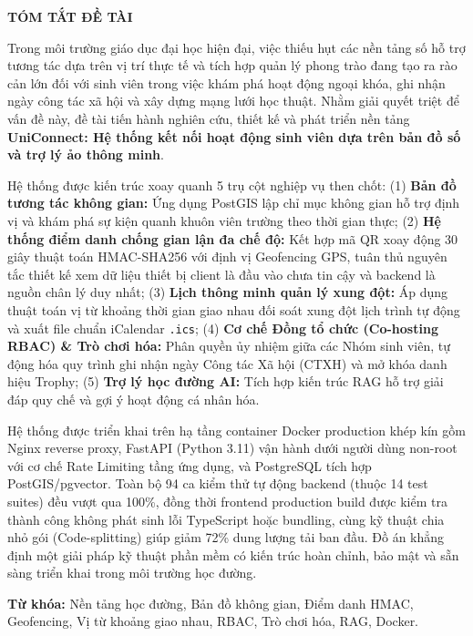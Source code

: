 \begin{center}
    \Large{\textbf{TÓM TẮT ĐỀ TÀI}}
\end{center}

Trong môi trường giáo dục đại học hiện đại, việc thiếu hụt các nền tảng số hỗ trợ tương tác dựa trên vị trí thực tế và tích hợp quản lý phong trào đang tạo ra rào cản lớn đối với sinh viên trong việc khám phá hoạt động ngoại khóa, ghi nhận ngày công tác xã hội và xây dựng mạng lưới học thuật. Nhằm giải quyết triệt để vấn đề này, đề tài tiến hành nghiên cứu, thiết kế và phát triển nền tảng \textbf{UniConnect: Hệ thống kết nối hoạt động sinh viên dựa trên bản đồ số và trợ lý ảo thông minh}.

Hệ thống được kiến trúc xoay quanh 5 trụ cột nghiệp vụ then chốt: (1) \textbf{Bản đồ tương tác không gian:} Ứng dụng PostGIS lập chỉ mục không gian hỗ trợ định vị và khám phá sự kiện quanh khuôn viên trường theo thời gian thực; (2) \textbf{Hệ thống điểm danh chống gian lận đa chế độ:} Kết hợp mã QR xoay động 30 giây thuật toán HMAC-SHA256 với định vị Geofencing GPS, tuân thủ nguyên tắc thiết kế xem dữ liệu thiết bị client là đầu vào chưa tin cậy và backend là nguồn chân lý duy nhất; (3) \textbf{Lịch thông minh quản lý xung đột:} Áp dụng thuật toán vị từ khoảng thời gian giao nhau đối soát xung đột lịch trình tự động và xuất file chuẩn iCalendar \texttt{.ics}; (4) \textbf{Cơ chế Đồng tổ chức (Co-hosting RBAC) \& Trò chơi hóa:} Phân quyền ủy nhiệm giữa các Nhóm sinh viên, tự động hóa quy trình ghi nhận ngày Công tác Xã hội (CTXH) và mở khóa danh hiệu Trophy; (5) \textbf{Trợ lý học đường AI:} Tích hợp kiến trúc RAG hỗ trợ giải đáp quy chế và gợi ý hoạt động cá nhân hóa.

Hệ thống được triển khai trên hạ tầng container Docker production khép kín gồm Nginx reverse proxy, FastAPI (Python 3.11) vận hành dưới người dùng non-root với cơ chế Rate Limiting tầng ứng dụng, và PostgreSQL tích hợp PostGIS/pgvector. Toàn bộ 94 ca kiểm thử tự động backend (thuộc 14 test suites) đều vượt qua 100\%, đồng thời frontend production build được kiểm tra thành công không phát sinh lỗi TypeScript hoặc bundling, cùng kỹ thuật chia nhỏ gói (Code-splitting) giúp giảm 72\% dung lượng tải ban đầu. Đồ án khẳng định một giải pháp kỹ thuật phần mềm có kiến trúc hoàn chỉnh, bảo mật và sẵn sàng triển khai trong môi trường học đường.

\textbf{Từ khóa:} Nền tảng học đường, Bản đồ không gian, Điểm danh HMAC, Geofencing, Vị từ khoảng giao nhau, RBAC, Trò chơi hóa, RAG, Docker.


